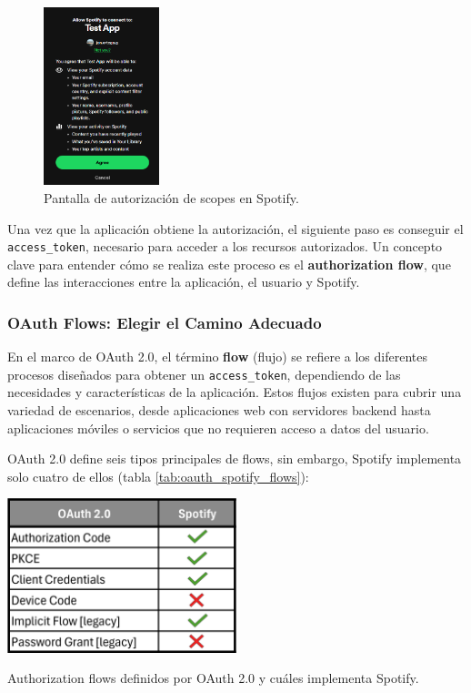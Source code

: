 \begin{figure}[H]
    \centering
    \includegraphics[width=0.3\textwidth]{./figures/auth_popup.png}
    \caption{Pantalla de autorización de scopes en Spotify.}
    \label{fig:auth_popup}
\end{figure}

Una vez que la aplicación obtiene la autorización, el siguiente paso es conseguir el \texttt{access\_token}, necesario para acceder a los recursos autorizados. Un concepto clave para entender cómo se realiza este proceso es el \textbf{authorization flow}, que define las interacciones entre la aplicación, el usuario y Spotify.

\subsubsection*{OAuth Flows: Elegir el Camino Adecuado}

En el marco de OAuth 2.0, el término \textbf{flow} (flujo) se refiere a los diferentes procesos diseñados para obtener un \texttt{access\_token}, dependiendo de las necesidades y características de la aplicación. Estos flujos existen para cubrir una variedad de escenarios, desde aplicaciones web con servidores backend hasta aplicaciones móviles o servicios que no requieren acceso a datos del usuario.

OAuth 2.0 define seis tipos principales de flows, sin embargo, Spotify implementa solo cuatro de ellos (tabla \ref{tab:oauth_spotify_flows}):

\begin{table}[H]
    \centering
    \includegraphics[width=0.5\textwidth]{figures/oauth_vs_spotify_flows.png}
    \caption{Authorization flows definidos por OAuth 2.0 y cuáles implementa Spotify.}
    \label{tab:oauth_spotify_flows}
\end{table}

